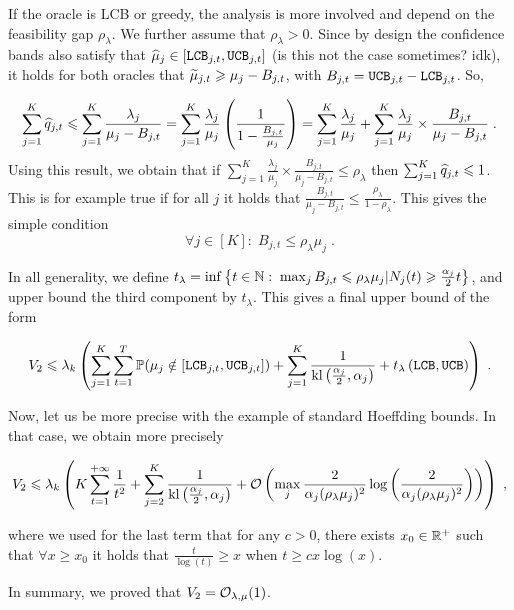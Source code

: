If the oracle is LCB or greedy, the analysis is more involved and depend on the feasibility gap $\rho_\lambda$. We further assume that $\rho_\lambda>0$. Since by design the confidence bands also satisfy that $\widehat{\mu}_j \in [\texttt{LCB}_{j, t}, \texttt{UCB}_{j, t}]$ (is this not the case sometimes? idk), it holds for both oracles that $\widetilde{\mu}_{j, t}\geqslant \mu_j- B_{j, t}$, with $B_{j,t} = \texttt{UCB}_{j, t} - \texttt{LCB}_{j, t}$. So, 

\begin{align*}
\sum_{j=1}^K \widehat{q}_{j, t} \leqslant \sum_{j=1}^K \frac{\lambda_j}{\mu_j - B_{j, t}} = \sum_{j=1}^K \frac{\lambda_j}{\mu_j}\left(\frac{1}{1-\frac{B_{j, t}}{\mu_j}}\right) = \sum_{j=1}^K \frac{\lambda_j}{\mu_j} + \sum_{j=1}^K \frac{\lambda_j}{\mu_j}\times \frac{B_{j, t}}{\mu_j - B_{j, t}} \;.  \\
\end{align*}
Using this result, we obtain that if $\sum_{j=1}^K \frac{\lambda_j}{\mu_j}\times \frac{B_{j, t}}{\mu_j - B_{j, t}} \leq \rho_\lambda$ then $\sum_{j=1}^K \widehat{q}_{j, t}\leqslant 1$. This is for example true if for all $j$ it holds that $\frac{B_{j, t}}{\mu_j-B_{j, t}}\leq \frac{\rho_\lambda}{1-\rho_\lambda}$. This gives the simple condition \[\forall j \in [K]: \; B_{j,t}\leq \rho_\lambda \mu_j \;. \]

In all generality, we define $t_\lambda= \inf\left\{t \in \mathbb{N}: \; \max_j B_{j,t}\leqslant \rho_\lambda \mu_j | N_j(t)\geqslant \frac{\alpha_j}{2}t \right\}$, and upper bound the third component by $t_\lambda$. This gives a final upper bound of the form 

\[V_2 \leqslant \lambda_k \left(\sum_{j=1}^K \sum_{t=1}^T \mathbb{P}(\mu_j \notin [\texttt{LCB}_{j, t}, \texttt{UCB}_{j, t}]) +\sum_{j=1}^K   \frac{1}{\text{\normalfont kl}\left(\frac{\alpha_j}{2}, \alpha_j\right)} + t_\lambda\left(\texttt{LCB}, \texttt{UCB}\right) \right) \;.  \]

Now, let us be more precise with the example of standard Hoeffding bounds. In that case, we obtain more precisely

\[V_2 \leqslant \lambda_k \left(K \sum_{t=1}^{+\infty} \frac{1}{t^2} + \sum_{j=2}^K\frac{1}{\text{\normalfont kl}\left(\frac{\alpha_j}{2}, \alpha_j\right)} + \mathcal{O}\left(\max_j\frac{2}{\alpha_j(\rho_\lambda \mu_j)^2}\log\left(\frac{2}{\alpha_j(\rho_\lambda \mu_j)^2}\right)\right)\right) \;, \]

where we used for the last term that for any $c>0$, there exists $x_0 \in \mathbb{R}^+$ such that $\forall x\geq x_0$ it holds that $\frac{t}{\log(t)}\geq x$ when $t\geq c x \log(x)$. 

In summary, we proved that $V_2=\mathcal{O}_{\lambda, \mu}(1)$.


